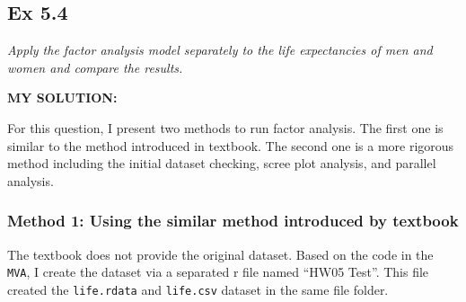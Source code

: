 \documentclass[
]{article}
\begin{document}
\hypertarget{ex-5.4}{%
\subsection{Ex 5.4}\label{ex-5.4}}

\emph{Apply the factor analysis model separately to the life
expectancies of men and women and compare the results.}

\textbf{MY SOLUTION:}

For this question, I present two methods to run factor analysis. The
first one is similar to the method introduced in textbook. The second
one is a more rigorous method including the initial dataset checking,
scree plot analysis, and parallel analysis.

\hypertarget{method-1-using-the-similar-method-introduced-by-textbook}{%
\subsubsection{Method 1: Using the similar method introduced by
textbook}\label{method-1-using-the-similar-method-introduced-by-textbook}}

The textbook does not provide the original dataset. Based on the code in
the \texttt{MVA}, I create the dataset via a separated r file named
``HW05 Test''. This file created the \texttt{life.rdata} and
\texttt{life.csv} dataset in the same file folder.
\end{document}
